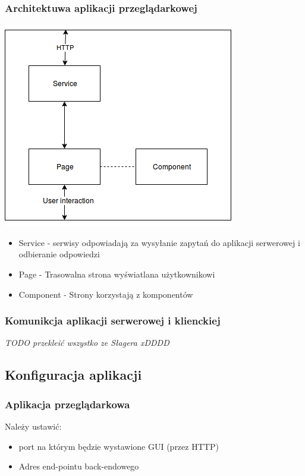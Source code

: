 \documentclass[polish,12pt]{aghthesis}
\begin{document}
\subsubsection{Architektuwa aplikacji przeglądarkowej}
\includegraphics[width=\textwidth]{front-schema}
\begin{itemize}
    \item Service - serwisy odpowiadają za wysyłanie zapytań do aplikacji serwerowej i odbieranie odpowiedzi
    \item Page - Trasowalna strona wyświatlana użytkownikowi
    \item Component - Strony korzystają z komponentów
\end{itemize}

\subsubsection{Komunikcja aplikacji serwerowej i klienckiej}
\emph{TODO przekleić wszystko ze Słagera xDDDD}

\subsection{Konfiguracja aplikacji}
\subsubsection{Aplikacja przeglądarkowa}{Należy ustawić:
\begin{itemize}
    \item port na którym będzie wystawione GUI (przez HTTP)
    \item Adres end-pointu back-endowego
\end{itemize}}
\end{document}
